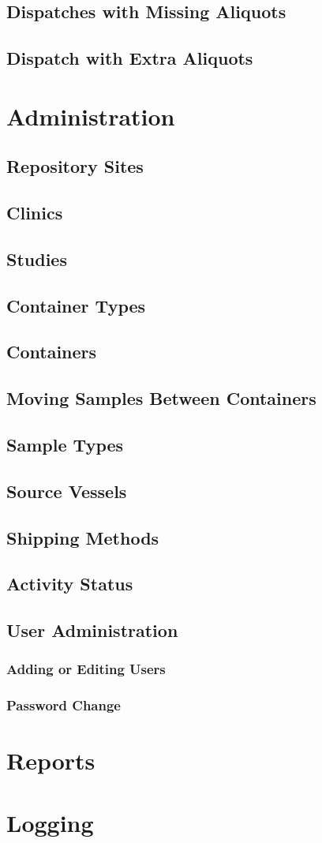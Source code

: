 \section{Dispatches with Missing Aliquots}
\section{Dispatch with Extra Aliquots}
\chapter{Administration}
\section{Repository Sites}
\section{Clinics}
\section{Studies}
\section{Container Types}
\section{Containers}
\section{Moving Samples Between Containers}
\section{Sample Types}
\section{Source Vessels}
\section{Shipping Methods}
\section{Activity Status}
\section{User Administration}
\subsection{Adding or Editing Users}
\subsection{Password Change}
\chapter{Reports}
\chapter{Logging}
